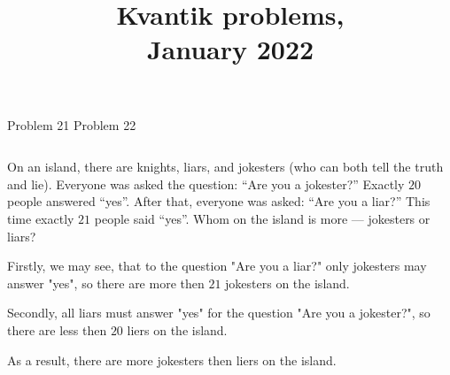 \documentclass[9pt,aspectratio=169]{beamer}
\title{Kvantik problems,\\ January 2022}
\begin{document}
\maketitle

\begin{frame}{Problem 21 \hspace*{5cm} Problem 22}
  \begin{columns}[T]
    \begin{column}{0.5\textwidth}
      \begin{problem}
        On an island, there are knights, liars, and jokesters (who can both tell the truth and lie). Everyone was asked the question: “Are you a jokester?” Exactly $20$ people answered “yes”. After that, everyone was asked: “Are you a liar?” This time exactly $21$ people said “yes”. Whom on the island is more — jokesters or liars?
      \end{problem}

      Firstly, we may see, that to the question "Are you a liar?" only jokesters may answer "yes", so there are more then $21$ jokesters on the island.

      Secondly, all liars must answer "yes" for the question "Are you a jokester?", so there are less then $20$ liers on the island.

      As a result, there are more jokesters then liers on the island.


\end{column}
\end{columns}
\end{frame}
\end{document}
